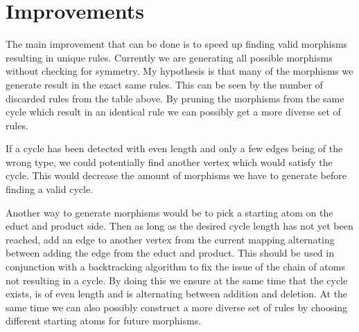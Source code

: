 \documentclass{article}
\begin{document}
\begin{figure}[h!]
\end{figure}

\newpage
\section{Improvements}
The main improvement that can be done is to speed up finding valid morphisms resulting in unique rules. Currently we are generating all possible morphisms without checking for symmetry. My hypothesis is that many of the morphisms we generate result in the exact same rules. This can be seen by the number of discarded rules from the table above. By pruning the morphisms from the same cycle which result in an identical rule we can possibly get a more diverse set of rules.

If a cycle has been detected with even length and only a few edges being of the wrong type, we could potentially find another vertex which would satisfy the cycle. This would decrease the amount of morphisms we have to generate before finding a valid cycle.

Another way to generate morphisms would be to pick a starting atom on the educt and product side. Then as long as the desired cycle length has not yet been reached, add an edge to another vertex from the current mapping alternating between adding the edge from the educt and product. This should be used in conjunction with a backtracking algorithm to fix the issue of the chain of atoms not resulting in a cycle. By doing this we ensure at the same time that the cycle exists, is of even length and is alternating between addition and deletion. At the same time we can also possibly construct a more diverse set of rules by choosing different starting atoms for future morphisms.
\end{document}
